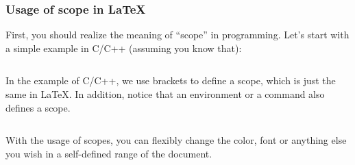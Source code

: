 \begin{frame}[fragile]
	\frametitle{Usage of scope in \LaTeX}
	First, you should realize the meaning of ``scope'' in programming. Let's start with a simple example in C/C++ (assuming you know that):
	\inputminted{c++}{examples/scope.cpp}
\end{frame}

\begin{frame}[fragile]
	In the example of C/C++, we use brackets \structure{\{\}} to define a scope, which is just the same in \LaTeX. In addition, notice that an environment or a command also defines a scope.

	\begin{example}
	\begin{multicols}{2}
		\inputminted{latex}{examples/scope.tex}
		\columnbreak
		
	\end{multicols}
	\end{example}

	With the usage of scopes, you can flexibly change the color, font or anything else you wish in a self-defined range of the document.

\end{frame}
